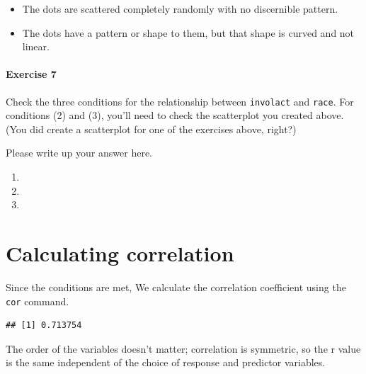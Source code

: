 \documentclass[
]{book}
\newenvironment{Shaded}{\begin{snugshade}}{\end{snugshade}}
\newcommand{\FunctionTok}[1]{\textcolor[rgb]{0.00,0.00,0.00}{#1}}
\newcommand{\NormalTok}[1]{#1}
\newcommand{\SpecialCharTok}[1]{\textcolor[rgb]{0.00,0.00,0.00}{#1}}
\providecommand{\tightlist}{%
  \setlength{\itemsep}{0pt}\setlength{\parskip}{0pt}}
\begin{document}
\begin{itemize}
\tightlist
\item
  The dots are scattered completely randomly with no discernible pattern.
\item
  The dots have a pattern or shape to them, but that shape is curved and not linear.
\end{itemize}

\hypertarget{exercise-7}{%
\paragraph*{Exercise 7}\label{exercise-7}}

Check the three conditions for the relationship between \texttt{involact} and \texttt{race}. For conditions (2) and (3), you'll need to check the scatterplot you created above. (You did create a scatterplot for one of the exercises above, right?)

Please write up your answer here.

\begin{enumerate}
\def\labelenumi{\arabic{enumi}.}
\tightlist
\item
\item
\item
\end{enumerate}

\hypertarget{correlation-calculating}{%
\section{Calculating correlation}\label{correlation-calculating}}

Since the conditions are met, We calculate the correlation coefficient using the \texttt{cor} command.

\begin{Shaded}
\end{Shaded}

\begin{verbatim}
## [1] 0.713754
\end{verbatim}

The order of the variables doesn't matter; correlation is symmetric, so the r value is the same independent of the choice of response and predictor variables.
\end{document}
